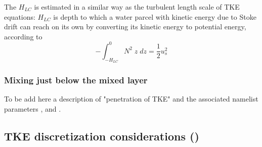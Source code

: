 The $H_{LC}$ is estimated in a similar way as the turbulent length scale of TKE equations:
$H_{LC}$ is depth to which a water parcel with kinetic energy due to Stoke drift
can reach on its own by converting its kinetic energy to potential energy, according to 
\begin{equation}
- \int_{-H_{LC}}^0 { N^2\;z  \;dz} = \frac{1}{2} u_s^2
\end{equation}


\subsubsection{Mixing just below the mixed layer}

To be add here a description of "penetration of TKE" and the associated namelist parameters
 ,  and .




\subsection{TKE discretization considerations ()}
\label{ZDF_tke_ene}

